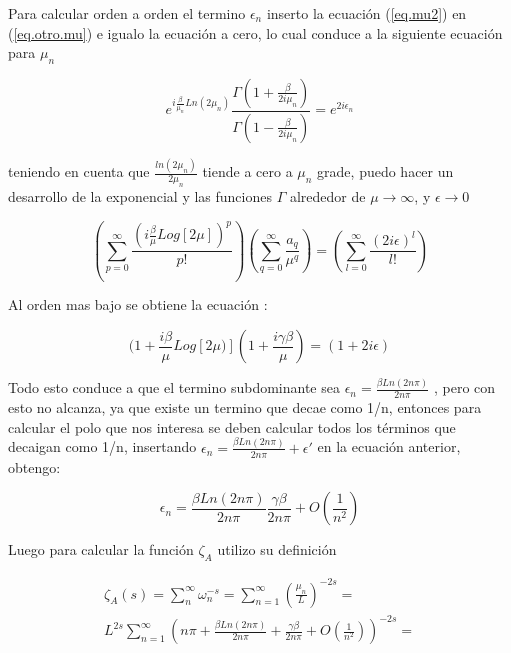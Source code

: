 Para calcular orden a orden el termino $\epsilon _n$ inserto la ecuación (\ref{eq.mu2}) en (\ref{eq.otro.mu}) e igualo la ecuación a cero, lo cual conduce a la siguiente ecuación para $\mu _n$

\begin{equation}
	e ^{ i \frac{\beta}{ \mu _n} Ln(2 \mu _n)}     
    \frac{\Gamma(1 + \frac{ \beta}{2 i \mu _n} ) }
    {\Gamma(1 - \frac{ \beta}{2 i \mu _n})} =    
    e ^{2 i \epsilon _n }
\end{equation}

teniendo en cuenta que $\frac{ln(2 \mu _n)}{2 \mu _n }$ tiende a cero a $\mu _n$ grade, puedo hacer un desarrollo de la exponencial y las funciones $\Gamma$ alrededor de $ \mu \rightarrow \infty $, y $\epsilon \rightarrow 0$

\begin{equation}
    \left(
    \sum _{p = 0} ^{\infty} \frac{( i \frac{\beta}{ \mu} Log[2 \mu]) ^p }{p!}
    \right)
    \left(
	\sum _{q = 0} ^{\infty} \frac{a _q}{\mu ^q}
	\right)
    =
    \left(
    \sum _{l = 0} ^{\infty} \frac{( 2 i \epsilon)^l}{l !}
    \right)
\end{equation}


Al orden mas bajo se obtiene la ecuación : 

\begin{equation}
(1 + \frac{i \beta}{ \mu} Log[2 \mu)] 
(1 + \frac{i  \gamma \beta}{ \mu})  =
(1 + 2 i \epsilon)
\end{equation}

Todo esto conduce a que el termino subdominante sea $\epsilon _n =  \frac{\beta Ln(2 n \pi)}{2 n \pi}$ , pero con esto no alcanza, ya que existe un termino que decae como 1/n, entonces para calcular el polo que nos interesa se deben calcular todos los términos que decaigan como 1/n, insertando $\epsilon _n =  \frac{\beta Ln(2 n \pi)}{2 n \pi} + \epsilon '$ en la ecuación anterior, obtengo:


\begin{equation}
    \epsilon _n =  \frac{\beta Ln(2 n \pi)}{2 n \pi} 
                \frac{\gamma \beta}{2 n \pi} +
                O(\frac{1}{n^2})
\end{equation}

Luego para calcular la función $\zeta _{A}$ utilizo su definición

\begin{equation}
\begin{array}{c}
    \zeta _A (s) = \sum _n ^{\infty} \omega _n ^{-s}  =
    \sum _{n=1} ^{\infty} \left(\frac{\mu _n}{L} \right) ^{-2 s} =  \\
    L ^{2 s} \sum _{n=1} ^{\infty} 
    \left( 
    n \pi + \frac{\beta Ln(2 n \pi)}{2 n \pi} + \frac{\gamma \beta}{2 n \pi} +
    O(\frac{1}{n^2})
    \right) ^{-2s} = \\
    
\end{array}
\end{equation}


